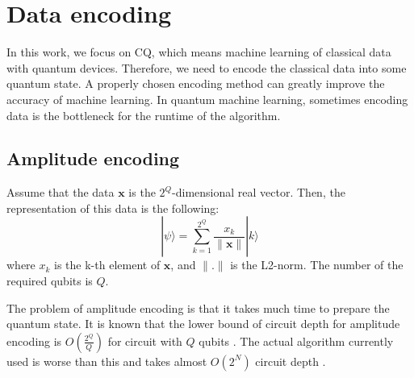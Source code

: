 \section{Data encoding}
\par In this work, we focus on CQ, which means machine learning of classical data with quantum devices. Therefore, we need to encode the classical data into some  quantum state. A properly chosen encoding method can greatly improve the accuracy of machine learning. In quantum machine learning, sometimes encoding data is the bottleneck for the runtime of the algorithm. 

\subsection{Amplitude encoding}
\par Assume that the data $\bm{x}$ is the $2^Q$-dimensional real vector. Then, the representation of this data is the following:
$$|\psi\rangle=\sum_{k=1}^{2^Q}\frac{x_k}{\|\bm{x}\|}|k\rangle$$
where $x_k$ is the k-th element of $\bm{x}$, and $\|.\|$ is the L2-norm. The number of the required qubits is $Q$.

\par The problem of amplitude encoding is that it takes much time to prepare the quantum state. It is known that the lower bound of circuit depth for amplitude encoding is $O\left(\frac{2^Q}{Q}\right)$ for circuit with $Q$ qubits \cite{lower}. The actual algorithm currently used is worse than this and takes almost $O(2^N)$ circuit depth \cite{book1}.

